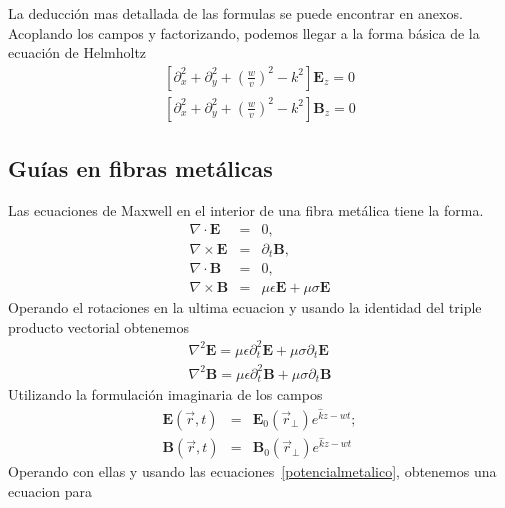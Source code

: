 La deducción mas detallada de las formulas se puede encontrar en anexos. Acoplando los campos y factorizando, podemos llegar a la forma básica de la ecuación de Helmholtz 
\begin{subequations}\label{Helmholtz}
	\begin{align}
	[\partial_{x}^2+\partial_{y}^2+(\frac{w}{v})^2-k^2] \mathbf{E}_{z}=0\\
	[\partial_{x}^2+\partial_{y}^2+(\frac{w}{v})^2-k^2] \mathbf{B}_{z}=0
	\end{align}
\end{subequations}
\subsection{Guías en fibras metálicas}
Las ecuaciones de Maxwell en el interior de una fibra metálica tiene la forma.
\begin{subequations} \label{mawxellmetalicas}
	\begin{eqnarray}
	\nabla \cdot \mathbf{E} &=& 0 ,\\
	\nabla \times \mathbf{E} &=& \partial_{t}\mathbf{B}, \\
	\nabla \cdot \mathbf{B} &=& 0, \\ 
	\nabla \times \mathbf{B} &=& \mu \epsilon \mathbf{E} + \mu \sigma \mathbf{E}  
	\end{eqnarray}
\end{subequations}
Operando el rotaciones en la ultima ecuacion y usando la identidad del triple producto vectorial obtenemos
\begin{subequations}\label{potencialmetalico}
	\begin{align}
	\nabla^2 \mathbf{E}=\mu \epsilon \partial_{t}^2\mathbf{E}+\mu\sigma \partial_{t} \mathbf{E} \\
	\nabla^2 \mathbf{B}=\mu \epsilon \partial_{t}^2\mathbf{B}+\mu\sigma \partial_{t} \mathbf{B} 
	\end{align}
\end{subequations}
Utilizando la formulación imaginaria de los campos
\begin{eqnarray}
\mathbf{\mathbf{E}}(\vec{r},t) &=& \mathbf{E}_{0}(\vec{r}_{\perp}) e^{\hat{k}z-wt} ; \\
\mathbf{\mathbf{B}}(\vec{r},t) &=& \mathbf{B}_{0}(\vec{r}_{\perp}) e^{\hat{k}z-wt} 
\end{eqnarray}
Operando con ellas y usando las ecuaciones~\ref{potencialmetalico}, obtenemos una ecuacion para
